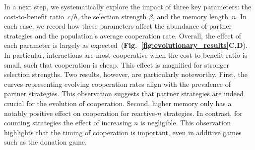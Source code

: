 \documentclass[9pt,twocolumn,twoside]{pnas-new}
\newcommand{\figref}[1]{{\textbf{Fig.~\ref{#1}}}}
\begin{document}
In a next step, we systematically explore the impact of three key parameters: the cost-to-benefit ratio~$c/b$, the selection strength $\beta$, and the memory length~$n$. 
In each case, we record how these parameters affect the abundance of partner strategies and the population's average cooperation rate. 
Overall, the effect of each parameter is largely as expected~(\figref{fig:evolutionary_results}\textbf{C,D}).  
In particular, interactions are most cooperative when the cost-to-benefit ratio is small, such that cooperation is cheap. 
This effect is magnified for stronger selection strengths. 
Two results, however, are particularly noteworthy. 
First, the curves representing evolving cooperation rates align with the prevalence of partner strategies. 
This observation suggests that partner strategies are indeed crucial for the evolution of cooperation. 
Second, higher memory only has a notably positive effect on cooperation for reactive-$n$ strategies. 
In contrast, for counting strategies the effect of increasing $n$ is negligible. 
This observation highlights that the timing of cooperation is important, even in additive games such as the donation game. 
\end{document}
